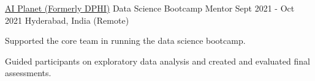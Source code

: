 \begin{cventries}
  \cventry
    {\href{https://aiplanet.com/}{AI Planet (Formerly DPHI)}} %
    {Data Science Bootcamp Mentor} %
    {Sept 2021 - Oct 2021} %
    {Hyderabad, India (Remote)} %
    {
      \begin{cvitems} 
        \item {Supported the core team in running the data science bootcamp.}
        \item{Guided participants on exploratory data analysis and created and evaluated final assessments.}
      \end{cvitems}
    }
\end{cventries}
